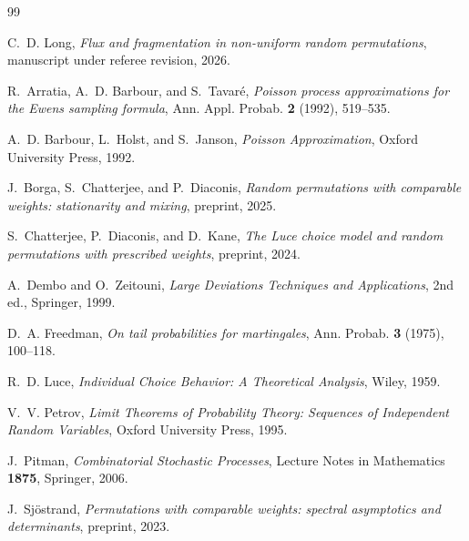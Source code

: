 \documentclass[11pt]{article}
\newcommand{\1}{\mathbf{1}}
\theoremstyle{remark}
\begin{document}
\begin{thebibliography}{99}

C.~D. Long,
\emph{Flux and fragmentation in non-uniform random permutations},
manuscript under referee revision, 2026.

R.~Arratia, A.~D. Barbour, and S.~Tavar\'e,
\emph{Poisson process approximations for the Ewens sampling formula},
Ann. Appl. Probab. \textbf{2} (1992), 519--535.

A.~D. Barbour, L.~Holst, and S.~Janson,
\emph{Poisson Approximation},
Oxford University Press, 1992.

J.~Borga, S.~Chatterjee, and P.~Diaconis,
\emph{Random permutations with comparable weights: stationarity and mixing},
preprint, 2025.

S.~Chatterjee, P.~Diaconis, and D.~Kane,
\emph{The Luce choice model and random permutations with prescribed
weights}, preprint, 2024.

A.~Dembo and O.~Zeitouni,
\emph{Large Deviations Techniques and Applications}, 2nd ed.,
Springer, 1999.

D.~A. Freedman,
\emph{On tail probabilities for martingales},
Ann. Probab. \textbf{3} (1975), 100--118.

R.~D. Luce,
\emph{Individual Choice Behavior: A Theoretical Analysis},
Wiley, 1959.

V.~V. Petrov,
\emph{Limit Theorems of Probability Theory: Sequences of Independent
Random Variables}, Oxford University Press, 1995.

J.~Pitman,
\emph{Combinatorial Stochastic Processes},
Lecture Notes in Mathematics \textbf{1875}, Springer, 2006.

J.~Sj\"ostrand,
\emph{Permutations with comparable weights: spectral asymptotics and
determinants}, preprint, 2023.

\end{thebibliography}
\end{document}
